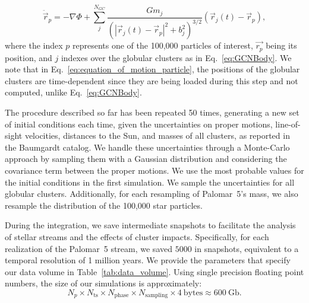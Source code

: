 \begin{enumerate}
                \begin{equation}
                    \ddot{\vec{r}}_p = -\nabla \Phi + \left.\sum_{j}^{N_{GC}} \frac{Gm_j}{\left(|\vec{r}_j(t) - \vec{r}_p|^2 + b_j^2\right)^{3/2}}\right. \left(\vec{r}_j(t)- \vec{r}_p\right),
                \end{equation} \label{eq:equation_of_motion_particle} where the index $p$ represents one of the 100,000 particles of interest, $\vec{r_p}$ being its position, and $j$ indexes over the globular clusters as in Eq.~\ref{eq:GCNBody}. We note that in Eq.~\ref{eq:equation_of_motion_particle}, the positions of the globular clusters are time-dependent since they are being loaded during this step and not computed, unlike Eq.~\ref{eq:GCNBody}. 
            \end{enumerate}

            The procedure described so far has been repeated 50 times, generating a new set of initial conditions each time, given the uncertainties on proper motions, line-of-sight velocities, distances to the Sun, and masses of all clusters, as reported in the Baumgardt catalog. We handle these uncertainties through a Monte-Carlo approach by sampling them with a Gaussian distribution and considering the covariance term between the proper motions. We use the most probable values for the initial conditions in the first simulation. We sample the uncertainties for all globular clusters. Additionally, for each resampling of Palomar~5's mass, we also resample the distribution of the 100,000 star particles. 

            During the integration, we save intermediate snapshots to facilitate the analysis of stellar streams and the effects of cluster impacts. Specifically, for each realization of the Palomar~5 stream, we saved $5000$ in snapshots, equivalent to a temporal resolution of 1 million years. We provide the parameters that specify our data volume in Table~\ref{tab:data_volume}. Using single precision floating point numbers, the size of our simulations is approximately:
            \begin{equation} \label{eq:data_volume_estimate}
                N_p \times N_{\mathrm{ts}}\times N_{\mathrm{phase}}\times N_{\mathrm{sampling}} \times 4~\mathrm{bytes}\approx 600~\mathrm{Gb}.
            \end{equation}

